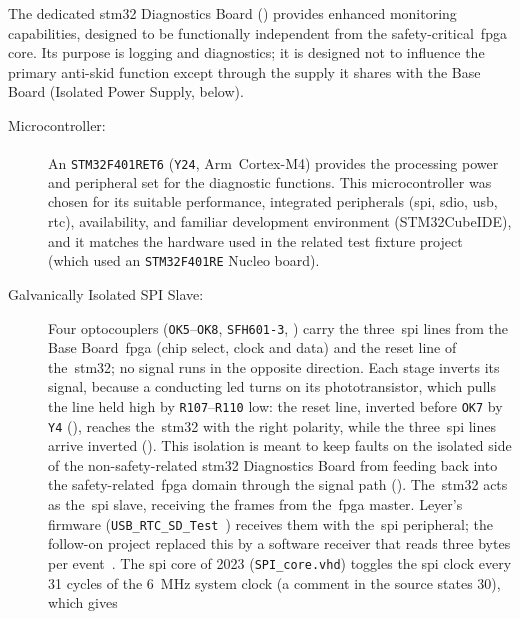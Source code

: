 The dedicated \gls{stm32} Diagnostics Board () provides enhanced monitoring capabilities, designed to be functionally independent from the safety-critical~\gls{fpga} core. Its purpose is logging and diagnostics; it is designed not to influence the primary anti-skid function except through the supply it shares with the Base Board (Isolated Power Supply, below).

\begin{description}
	\item[Microcontroller:] An \texttt{STM32F401RET6} (\texttt{Y24}, Arm\textsuperscript{\textregistered}~Cortex\textsuperscript{\textregistered}-M4) provides the processing power and peripheral set for the diagnostic functions. This microcontroller was chosen for its suitable performance, integrated peripherals (\gls{spi}, \gls{sdio}, \gls{usb}, \gls{rtc}), availability, and familiar development environment (STM32CubeIDE), and it matches the hardware used in the related test fixture project~\cite{dolata2023} (which used an \texttt{STM32F401RE} Nucleo board).
	\item[Galvanically Isolated SPI Slave:] Four optocouplers (\texttt{OK5}--\texttt{OK8}, \texttt{SFH601-3}, ) carry the three~\gls{spi} lines from the Base Board~\gls{fpga} (chip select, clock and data) and the reset line of the~\gls{stm32}; no signal runs in the opposite direction. Each stage inverts its signal, because a conducting \gls{led} turns on its phototransistor, which pulls the line held high by \texttt{R107}--\texttt{R110} low: the reset line, inverted before \texttt{OK7} by \texttt{Y4} (), reaches the~\gls{stm32} with the right polarity, while the three~\gls{spi} lines arrive inverted (). This isolation is meant to keep faults on the isolated side of the non-safety-related \gls{stm32} Diagnostics Board from feeding back into the safety-related~\gls{fpga} domain through the signal path (). The~\gls{stm32} acts as the~\gls{spi} slave, receiving the frames from the~\gls{fpga} master. Leyer's firmware (\texttt{USB\_RTC\_SD\_Test}~\cite{leyer2023}) receives them with the~\gls{spi} peripheral; the follow-on project replaced this by a software receiver that reads three bytes per event~\cite[p.~16]{savchuk2025}. The \gls{spi} core of 2023 (\texttt{SPI\_core.vhd}) toggles the \gls{spi} clock every 31 cycles of the \SI{6}{\mega\hertz} system clock (a comment in the source states 30), which gives
	      \begin{equation}

\end{equation}
\end{description}
